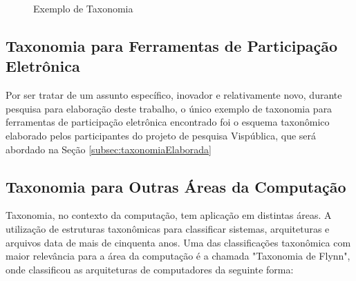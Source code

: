 \begin{figure}[!ht]
\caption{Exemplo de Taxonomia}
\label{fig:exemploTaxonomia}  
\end{figure}

\subsection{Taxonomia para Ferramentas de Participação Eletrônica}
\label{subsec:taxonomia e-part tools}
\par
Por ser tratar de um assunto específico, inovador e relativamente novo, durante pesquisa para elaboração deste trabalho,
o único exemplo de taxonomia para ferramentas de participação eletrônica encontrado foi o esquema taxonômico elaborado pelos participantes do projeto de pesquisa Vispública, 
que será abordado na Seção \ref{subsec:taxonomiaElaborada}


\subsection{Taxonomia para Outras Áreas da Computação}
\label{subsec:taxonomia other computer areas}
Taxonomia, no contexto da computação, tem aplicação em distintas áreas. A utilização de estruturas taxonômicas para classificar sistemas, arquiteturas e arquivos data de mais de
cinquenta anos. Uma das classificações taxonômica com maior relevância para a área da computação é a chamada "Taxonomia de Flynn",
onde  classificou as arquiteturas de computadores da seguinte forma:\\


